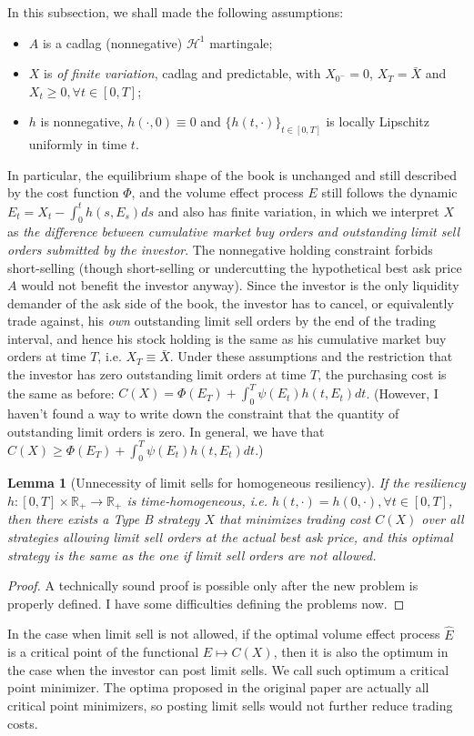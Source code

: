 \documentclass[openany,oneside]{article}
\newtheorem{lem}[thm]{Lemma}
\theoremstyle{definition}
\theoremstyle{remark}
\begin{document}
{\color{red}
In this subsection, we shall made the following assumptions:
\begin{itemize}
\item $A$ is a cadlag (nonnegative) $\mathcal{H}^1$ martingale;
\item $X$ is \emph{of finite variation}, cadlag and predictable, with $X_{0^-}=0$, $X_T = \bar{X}$ and $X_t \ge 0, \forall t\in[0,T]$;
\item $h$ is nonnegative, $h(\cdot, 0) \equiv 0$ and $\{h(t,\cdot)\}_{t\in[0,T]}$ is locally Lipschitz uniformly in time $t$.
\end{itemize}
In particular, the equilibrium shape of the book is unchanged and still described by the cost function $\Phi$, and the volume effect process $E$ still follows the dynamic $E_t = X_t - \int_0^t h(s,E_s) ds$ and also has finite variation, in which we interpret $X$ as \emph{the difference between cumulative market buy orders and outstanding limit sell orders submitted by the investor}. The nonnegative holding constraint forbids short-selling (though short-selling or undercutting the hypothetical best ask price $A$ would not benefit the investor anyway). Since the investor is the only liquidity demander of the ask side of the book, the investor has to cancel, or equivalently trade against, his \emph{own} outstanding limit sell orders by the end of the trading interval, and hence his stock holding is the same as his cumulative market buy orders at time $T$, i.e. $X_T \equiv \bar{X}$. Under these assumptions and the restriction that the investor has zero outstanding limit orders at time $T$, the purchasing cost is the same as before: $C(X) = \Phi(E_T) + \int_0^T \psi(E_t) h(t,E_t) dt$. (However, I haven't found a way to write down the constraint that the quantity of outstanding limit orders is zero. In general, we have that $C(X) \ge \Phi(E_T) + \int_0^T \psi(E_t) h(t,E_t) dt$.)

\begin{lem}[Unnecessity of limit sells for homogeneous resiliency]
If the resiliency $h:[0,T]\times \mathbb{R}_+ \to \mathbb{R}_+$ is time-homogeneous, i.e. $h(t,\cdot) = h(0,\cdot), \forall t\in[0,T]$, then there exists a Type B strategy $X$ that minimizes trading cost $C(X)$ over all strategies allowing limit sell orders at the actual best ask price, and this optimal strategy is the same as the one if limit sell orders are not allowed.
\end{lem}

\begin{proof}
A technically sound proof is possible only after the new problem is properly defined. I have some difficulties defining the problems now.
\end{proof}

In the case when limit sell is not allowed, if the optimal volume effect process $\hat{E}$ is a critical point of the functional $E\mapsto C(X)$, then it is also the optimum in the case when the investor can post limit sells. We call such optimum a critical point minimizer. The optima proposed in the original paper are actually all critical point minimizers, so posting limit sells would not further reduce trading costs. 
}
\end{document}
